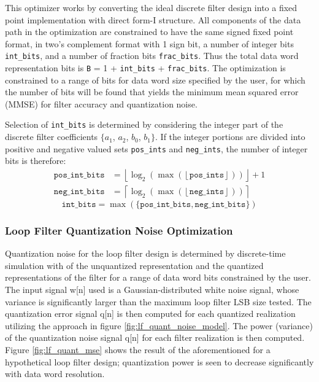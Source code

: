 This optimizer works by converting the ideal discrete filter design into a fixed point implementation with direct form-I structure. All components of the data path in the optimization are constrained to have the same signed fixed point format, in two's complement format with 1 sign bit, a number of integer bits \texttt{int\_bits}, and a number of fraction bits \texttt{frac\_bits}. Thus the total data word representation bits is \texttt{B} = 1 + \texttt{int\_bits} + \texttt{frac\_bits}. The optimization is constrained to a range of bits for data word size specified by the user, for which the number of bits will be found that yields the minimum mean squared error (MMSE) for filter accuracy and quantization noise.

Selection of \texttt{int\_bits} is determined by considering the integer part of the discrete filter coefficients $\{a_1$, $a_2$, $b_0$, $b_1\}$. If the integer portions are divided into positive and negative valued sets \texttt{pos\_ints} and \texttt{neg\_ints}, the number of integer bits is therefore:
\begin{align}
	\mathtt{pos\_int\_bits} &= \left\lfloor \log_2\left(\max\left(\left\lfloor \mathtt{pos\_ints} \right\rfloor\right)\right) \right\rfloor +1\\
	\mathtt{neg\_int\_bits} &= \left\lceil \log_2\left(\max\left(\left\lfloor \mathtt{neg\_ints} \right\rfloor\right)\right) \right\rceil
\end{align}
\begin{equation}
	\mathtt{int\_bits} = \max(\mathtt{\{pos\_int\_bits}, \mathtt{neg\_int\_bits}\})
\end{equation}

\subsubsection{Loop Filter Quantization Noise Optimization}\label{lf_quant_noise_opt}
Quantization noise for the loop filter design is determined by discrete-time simulation with of the unquantized representation and the quantized representations of the filter for a range of data word bits constrained by the user. The input signal w[n] used is a Gaussian-distributed white noise signal, whose variance is significantly larger than the maximum loop filter LSB size tested. The quantization error signal q[n] is then computed for each quantized realization utilizing the approach in figure \ref{fig:lf_quant_noise_model}. The power (variance) of the quantization noise signal q[n] for each  filter realization is then computed. Figure \ref{fig:lf_quant_mse} shows the result of the aforementioned for a hypothetical loop filter design; quantization power is seen to decrease significantly with data word resolution.

